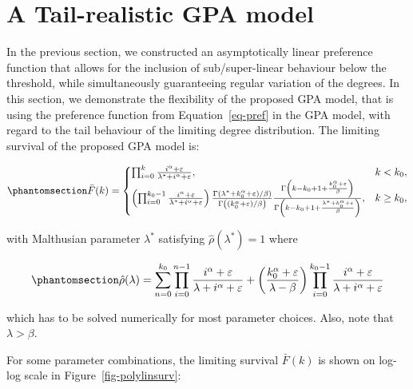 \documentclass[
  sn-basic,
  10pt,
]{sn-jnl}
\theoremstyle{plain}
\theoremstyle{plain}
\theoremstyle{remark}
\begin{document}
\newpage

\section{A Tail-realistic GPA model}\label{sec-model}

In the previous section, we constructed an asymptotically linear
preference function that allows for the inclusion of sub/super-linear
behaviour below the threshold, while simultaneously guaranteeing regular
variation of the degrees. In this section, we demonstrate the
flexibility of the proposed GPA model, that is using the preference
function from Equation~\ref{eq-pref} in the GPA model, with regard to
the tail behaviour of the limiting degree distribution. The limiting
survival of the proposed GPA model is:

\begin{equation}\phantomsection\label{eq-polysurv}{
\bar F(k) = \begin{cases}
\prod_{i=0}^{k}\frac{i^\alpha + \varepsilon}{\lambda^*+i^\alpha + \varepsilon},&k<k_0,\\
\left(\prod_{i=0}^{k_0-1}\frac{i^\alpha + \varepsilon}{\lambda^*+i^\alpha + \varepsilon}\right)\frac{\Gamma(\lambda^*+k_0^\alpha + \varepsilon)/\beta)}{\Gamma\left((k_0^\alpha + \varepsilon)/\beta\right)} \frac{\Gamma\left(k-k_0 + 1 +\frac{k_0^\alpha + \varepsilon}{\beta}\right)}{\Gamma\left(k-k_0 + 1 +\frac{\lambda^* +k_0^\alpha + \varepsilon}{\beta}\right)},&k\ge k_0,
\end{cases}
}\end{equation}

with Malthusian parameter \(\lambda^*\) satisfying
\(\hat \rho(\lambda^*)=1\) where

\begin{equation}\phantomsection\label{eq-rho}{
\hat\rho(\lambda) = \sum_{n=0}^{k_0}\prod_{i=0}^{n-1}\frac{i^\alpha + \varepsilon}{\lambda+i^\alpha + \varepsilon} + \left(\frac{k_0^\alpha + \varepsilon}{\lambda-\beta}\right)\prod_{i=0}^{k_0-1}\frac{i^\alpha + \varepsilon}{\lambda + i^\alpha + \varepsilon} 
}\end{equation}

which has to be solved numerically for most parameter choices. Also,
note that \(\lambda>\beta\).

For some parameter combinations, the limiting survival \(\bar F(k)\) is
shown on log-log scale in Figure~\ref{fig-polylinsurv}:
\end{document}
